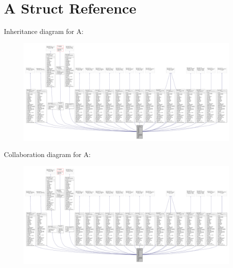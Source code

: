 \hypertarget{struct_a}{}\section{A Struct Reference}
\label{struct_a}


Inheritance diagram for A\+:
\nopagebreak
\begin{figure}[H]
\begin{center}
\leavevmode
\includegraphics[width=350pt]{struct_a__inherit__graph}
\end{center}
\end{figure}


Collaboration diagram for A\+:
\nopagebreak
\begin{figure}[H]
\begin{center}
\leavevmode
\includegraphics[width=350pt]{struct_a__coll__graph}
\end{center}
\end{figure}
